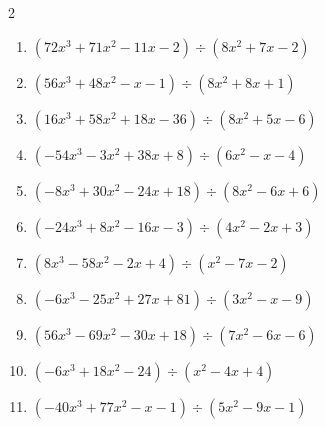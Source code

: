 \begin{multicols}{2}
\begin{enumerate}
  \item $(72x^{3}+71x^{2}-11x-2) \div (8x^{2}+7x-2)$

        \phantom{$商 : 9x+1, \quad 剰余 : 4x+7$}

  \item $(56x^{3}+48x^{2}-x-1) \div (8x^{2}+8x+1)$

        \phantom{$商 : 7x-1, \quad 剰余 : -3x-4$}

  \item $(16x^{3}+58x^{2}+18x-36) \div (8x^{2}+5x-6)$

        \phantom{$商 : 2x+6, \quad 剰余 : -6x-7$}

  \item $(-54x^{3}-3x^{2}+38x+8) \div (6x^{2}-x-4)$

        \phantom{$商 : -9x-2, \quad 剰余 : -4x+2$}

\columnbreak %

  \item $(-8x^{3}+30x^{2}-24x+18) \div (8x^{2}-6x+6)$

        \phantom{$商 : -x+3, \quad 剰余 : 1$}

  \item $(-24x^{3}+8x^{2}-16x-3) \div (4x^{2}-2x+3)$

        \phantom{$商 : -6x-1, \quad 剰余 : x+4$}

  \item $(8x^{3}-58x^{2}-2x+4) \div (x^{2}-7x-2)$

        \phantom{$商 : 8x-2, \quad 剰余 : -x-4$}

  \item $(-6x^{3}-25x^{2}+27x+81) \div (3x^{2}-x-9)$

        \phantom{$商 : -2x-9, \quad 剰余 : -2x+3$}

  \item $(56x^{3}-69x^{2}-30x+18) \div (7x^{2}-6x-6)$

        \phantom{$商 : 8x-3, \quad 剰余 : -8x+6$}

\columnbreak %

\resetques

  \item $(-6x^{3}+18x^{2}-24) \div (x^{2}-4x+4)$

        \phantom{$商 : -6x-6, \quad 剰余 : -2x+9$}

  \item $(-40x^{3}+77x^{2}-x-1) \div (5x^{2}-9x-1)$

        \phantom{$商 : -8x+1, \quad 剰余 : 7x+6$}


\end{enumerate}
\end{multicols}
